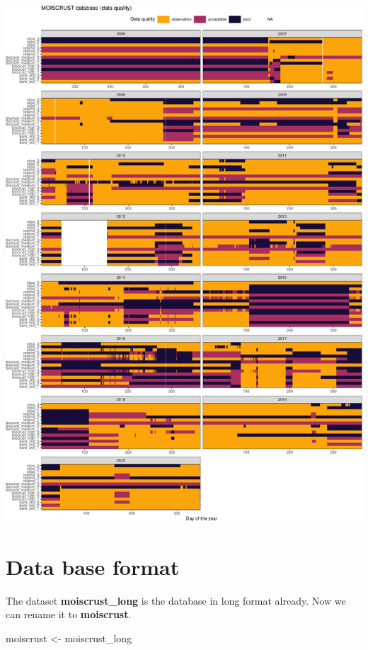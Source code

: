 \documentclass[]{article}
\newenvironment{Shaded}{\begin{snugshade}}{\end{snugshade}}
\newcommand{\NormalTok}[1]{#1}
\newcommand{\StringTok}[1]{\textcolor[rgb]{0.31,0.60,0.02}{#1}}
\begin{document}
\includegraphics{moiscrust_files/figure-latex/unnamed-chunk-30-1.pdf}

\hypertarget{data-base-format}{%
\section{Data base format}\label{data-base-format}}

The dataset \textbf{moiscrust\_long} is the database in long format
already. Now we can rename it to \textbf{moiscrust}.

\begin{Shaded}
\begin{Highlighting}[]
\NormalTok{moiscrust <-}\StringTok{ }\NormalTok{moiscrust_long}
\end{Highlighting}
\end{Shaded}
\end{document}
